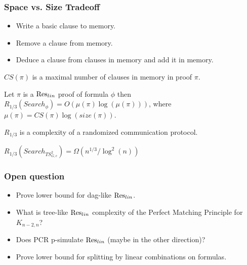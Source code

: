 \begin{frame}
    \frametitle{Space vs. Size Tradeoff}

    \pause
    \begin{itemize}
    	\item Write a basic clause to memory.
    	\item Remove a clause from memory.
    	\item Deduce a clause from clauses in memory and add it in memory.
    \end{itemize}

    \pause
    $CS(\pi)$ is a maximal number of clauses in memory in proof $\pi$.

    \pause
    \begin{theorem}
        Let $\pi$ is a $\mathrm{Res}_{lin}$ proof of formula $\phi$ then $R_{1 / 3}(Search_{\phi}) = O(\mu(\pi) \log(\mu(\pi)))$,
        where $\mu(\pi) = CS(\pi) \log(size(\pi))$.
    \end{theorem}

    $R_{1 / 3}$ is a complexity of a randomized communication protocol.
    
    \pause

    $R_{1 / 3}(Search_{TS_{G,c}^2}) = \Omega(n^{1 / 3} / \log^2(n))$
\end{frame}


\begin{frame}
    \frametitle{Open question}

    \begin{itemize}
		\item Prove lower bound for dag-like $\mathrm{Res}_{lin}$.
		\item What is tree-like $\mathrm{Res}_{lin}$ complexity of the Perfect Matching Principle for $K_{n - 2, n}$?
		\item Does PCR p-simulate $\mathrm{Res}_{lin}$ (maybe in the other direction)?
		\item Prove lower bound for splitting by linear combinations on  formulas.
	\end{itemize}
\end{frame}


